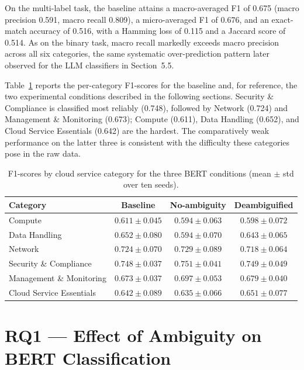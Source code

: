 On the multi-label task, the baseline attains a macro-averaged F1 of 0.675 (macro precision 0.591, macro recall 0.809), a micro-averaged F1 of 0.676, and an exact-match accuracy of 0.516, with a Hamming loss of 0.115 and a Jaccard score of 0.514. As on the binary task, macro recall markedly exceeds macro precision across all six categories, the same systematic over-prediction pattern later observed for the LLM classifiers in Section~5.5.

Table~\ref{tab:bert_perlabel} reports the per-category F1-scores for the baseline and, for reference, the two experimental conditions described in the following sections. Security \& Compliance is classified most reliably (0.748), followed by Network (0.724) and Management \& Monitoring (0.673); Compute (0.611), Data Handling (0.652), and Cloud Service Essentials (0.642) are the hardest. The comparatively weak performance on the latter three is consistent with the difficulty these categories pose in the raw data.

\begin{table}[h]
\centering
\caption{F1-scores by cloud service category for the three BERT conditions (mean $\pm$ std over ten seeds).}
\label{tab:bert_perlabel}
\footnotesize
\begin{tabular}{lccc}
\toprule
Category & Baseline & No-ambiguity & Deambiguified \\
\midrule
Compute                    & $0.611 \pm 0.045$ & $0.594 \pm 0.063$ & $0.598 \pm 0.072$ \\
Data Handling              & $0.652 \pm 0.080$ & $0.594 \pm 0.070$ & $0.643 \pm 0.065$ \\
Network                    & $0.724 \pm 0.070$ & $0.729 \pm 0.089$ & $0.718 \pm 0.064$ \\
Security \& Compliance     & $0.748 \pm 0.037$ & $0.751 \pm 0.041$ & $0.749 \pm 0.049$ \\
Management \& Monitoring   & $0.673 \pm 0.037$ & $0.697 \pm 0.053$ & $0.679 \pm 0.040$ \\
Cloud Service Essentials   & $0.642 \pm 0.089$ & $0.635 \pm 0.066$ & $0.651 \pm 0.077$ \\
\bottomrule
\end{tabular}
\end{table}

\section{RQ1 --- Effect of Ambiguity on BERT Classification}

